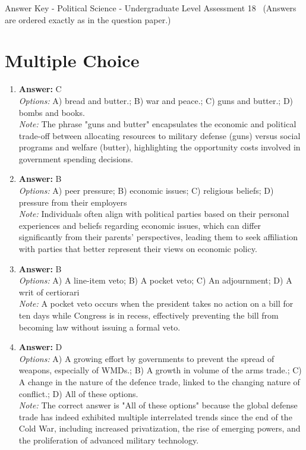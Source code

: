 \documentclass[12pt]{article}
\begin{document}
\begin{center}
Answer Key - Political Science - Undergraduate Level Assessment 18 \
\small (Answers are ordered exactly as in the question paper.)
\end{center}

\section*{Multiple Choice}
\begin{enumerate}[label=\arabic*.]
\item \textbf{Answer:} C
\\ \textit{Options:} A) bread and butter.; B) war and peace.; C) guns and butter.; D) bombs and books.
\\ \textit{Note:} The phrase "guns and butter" encapsulates the economic and political trade-off between allocating resources to military defense (guns) versus social programs and welfare (butter), highlighting the opportunity costs involved in government spending decisions.
\item \textbf{Answer:} B
\\ \textit{Options:} A) peer pressure; B) economic issues; C) religious beliefs; D) pressure from their employers
\\ \textit{Note:} Individuals often align with political parties based on their personal experiences and beliefs regarding economic issues, which can differ significantly from their parents' perspectives, leading them to seek affiliation with parties that better represent their views on economic policy.
\item \textbf{Answer:} B
\\ \textit{Options:} A) A line-item veto; B) A pocket veto; C) An adjournment; D) A writ of certiorari
\\ \textit{Note:} A pocket veto occurs when the president takes no action on a bill for ten days while Congress is in recess, effectively preventing the bill from becoming law without issuing a formal veto.
\item \textbf{Answer:} D
\\ \textit{Options:} A) A growing effort by governments to prevent the spread of weapons, especially of WMDs.; B) A growth in volume of the arms trade.; C) A change in the nature of the defence trade, linked to the changing nature of conflict.; D) All of these options.
\\ \textit{Note:} The correct answer is "All of these options" because the global defense trade has indeed exhibited multiple interrelated trends since the end of the Cold War, including increased privatization, the rise of emerging powers, and the proliferation of advanced military technology.

\end{enumerate}
\end{document}
